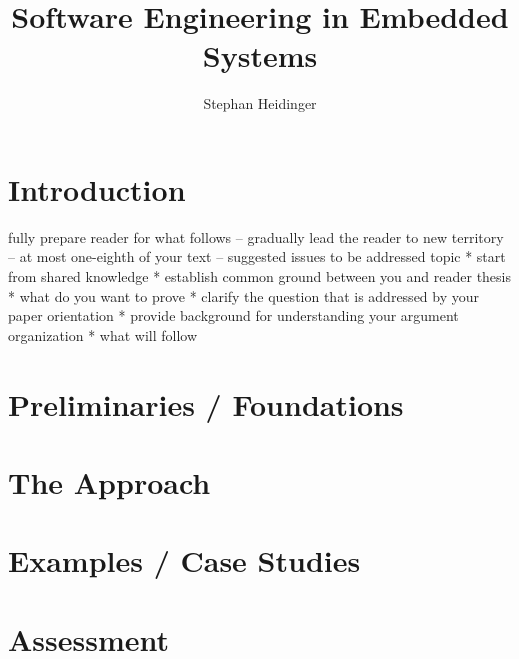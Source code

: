 \documentclass[10pt,a4paper,titlepage,draft]{report} %
\author{Stephan Heidinger}
\title{Software Engineering in Embedded Systems}
\begin{document}
\maketitle

\tableofcontents

\newpage


\section{Introduction}

fully prepare reader for what follows
– gradually lead the reader to new territory
– at most one-eighth of your text
– suggested issues to be addressed
	topic
		* start from shared knowledge
		* establish common ground between you and reader
	thesis
		* what do you want to prove
		* clarify the question that is addressed by your paper
	orientation
		* provide background for understanding your argument
	organization
		* what will follow



\section{Preliminaries / Foundations}

\section{The Approach}

\section{Examples / Case Studies}


\section{Assessment}
\end{document}
